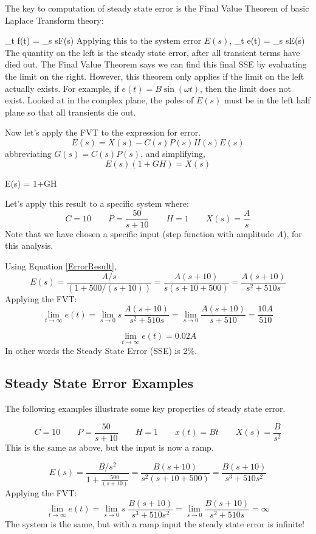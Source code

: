 The key to computation of steady state error is the Final Value Theorem of basic Laplace Transform theory:

\bq\label{FVTheorem}
\lim_{t\to\infty} f(t) = \lim_{s} sF(s)
\eq
Applying this to the system error $E(s)$, 
\bq
\lim_{t\to\infty} e(t) = \lim_{s} sE(s)
\eq
The quantity on the left is the steady state error, after all transient terms have died out.   The Final Value Theorem says we can find this final SSE by evaluating the limit on the right.  However, this theorem only applies if the limit on the left actually exists.  For example, if
$e(t) = B\sin(\omega t)$, then the limit does not exist.  Looked at in the complex plane, the poles of $E(s)$ must be in the left half plane so that all transients die out.

Now let's apply the FVT to the expression for error.
\[
E(s) = X(s) - C(s)P(s)H(s)E(s)
\]
abbreviating $G(s) = C(s)P(s)$, and simplifying,
\[
E(s) \left( 1+GH \right) = X(s)
\]

\bq\label{ErrorResult}
E(s) =  {1+GH}
\eq

Let's apply this result to a specific system where:
\[
C = 10 \qquad P = \frac{50}{s+10} \qquad H = 1 \qquad X(s) = \frac{A}{s}
\]
Note that we have chosen a specific input (step function with amplitude $A$), for this analysis.

Using Equation \ref{ErrorResult},
\[
E(s) = \frac{A/s}{(1+500/(s+10))} = \frac{A(s+10)}{s(s+10+500)}= \frac{A(s+10)}{s^2+510s}
\]
Applying the FVT:
\[
\lim_{t\to\infty} e(t) = \lim_{s\to 0} s\;\frac{A(s+10)}{s^2+510s} = \lim_{s\to 0} \frac{A(s+10)}{s+510} = \frac{10A}{510}
\]

\[
\lim_{t\to\infty} e(t) =  0.02A
\]
In other words the Steady State Error (SSE) is 2\%.


\subsection{Steady State Error Examples}

The following examples illustrate some key properties of steady state error.

\begin{ExampleSmall}
\[
C = 10 \qquad P = \frac{50}{s+10} \qquad H = 1 \qquad x(t) = Bt \qquad X(s) = \frac{B}{s^2}
\]
This is the same as above, but the input is now a ramp.

\[
E(s) = \frac{B/s^2}{1+\frac{500}{(s+10)}} = \frac{B(s+10)}{s^2(s+10+500)}= \frac{B(s+10)}{s^3+510s^2}
\]
Applying the FVT:
\[
\lim_{t\to\infty} e(t) = \lim_{s\to 0} s\;\frac{B(s+10)}{s^3+510s^2} = \lim_{s\to 0} \frac{B(s+10)}{s^2+510s} = \infty
\]
The system is the same, but with a ramp input the steady state error is infinite!

\end{ExampleSmall}



